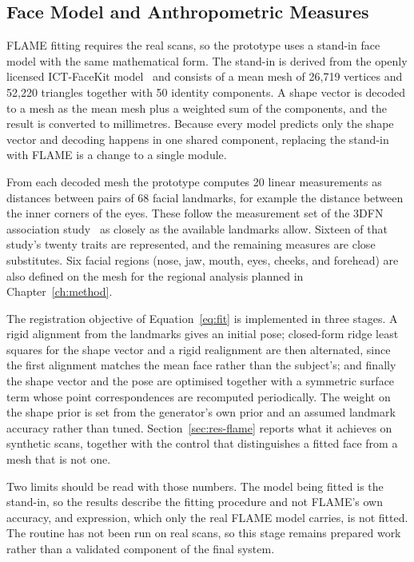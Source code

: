 \subsection{Face Model and Anthropometric Measures}
\label{sec:impl-flame}
FLAME fitting requires the real scans, so the prototype uses a stand-in face model with the same mathematical form. The stand-in is derived from the openly licensed ICT-FaceKit model~\cite{ref:ictfacekit} and consists of a mean mesh of 26{,}719 vertices and 52{,}220 triangles together with 50 identity components. A shape vector is decoded to a mesh as the mean mesh plus a weighted sum of the components, and the result is converted to millimetres. Because every model predicts only the shape vector and decoding happens in one shared component, replacing the stand-in with FLAME is a change to a single module.

From each decoded mesh the prototype computes 20 linear measurements as distances between pairs of 68 facial landmarks, for example the distance between the inner corners of the eyes. These follow the measurement set of the 3DFN association study~\cite{ref:shaffer} as closely as the available landmarks allow. Sixteen of that study's twenty traits are represented, and the remaining measures are close substitutes. Six facial regions (nose, jaw, mouth, eyes, cheeks, and forehead) are also defined on the mesh for the regional analysis planned in Chapter~\ref{ch:method}.

The registration objective of Equation~\ref{eq:fit} is implemented in three stages. A rigid alignment from the landmarks gives an initial pose; closed-form ridge least squares for the shape vector and a rigid realignment are then alternated, since the first alignment matches the mean face rather than the subject's; and finally the shape vector and the pose are optimised together with a symmetric surface term whose point correspondences are recomputed periodically. The weight on the shape prior is set from the generator's own prior and an assumed landmark accuracy rather than tuned. Section~\ref{sec:res-flame} reports what it achieves on synthetic scans, together with the control that distinguishes a fitted face from a mesh that is not one.

Two limits should be read with those numbers. The model being fitted is the stand-in, so the results describe the fitting procedure and not FLAME's own accuracy, and expression, which only the real FLAME model carries, is not fitted. The routine has not been run on real scans, so this stage remains prepared work rather than a validated component of the final system.

